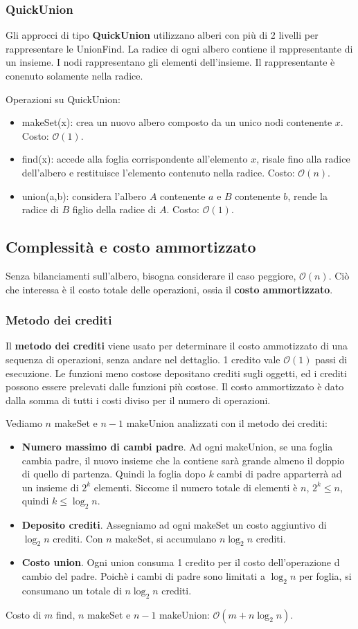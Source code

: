 \documentclass[11pt]{article}
\begin{document}
\subsubsection{QuickUnion}
Gli approcci di tipo \textbf{QuickUnion} utilizzano alberi con più di 2 livelli per rappresentare le UnionFind. La radice 
di ogni albero contiene il rappresentante di un insieme. I nodi rappresentano gli elementi dell'insieme. Il rappresentante 
è conenuto solamente nella radice.

Operazioni su QuickUnion:
\begin{itemize}
    \item makeSet(x): crea un nuovo albero composto da un unico nodi contenente $x$. Costo: $\mathcal{O}(1)$.
    \item find(x): accede alla foglia corrispondente all'elemento $x$, risale fino alla radice dell'albero e restituisce 
    l'elemento contenuto nella radice. Costo: $\mathcal{O}(n)$.
    \item union(a,b): considera l'albero $A$ contenente $a$ e $B$ contenente $b$, rende la radice di $B$ figlio della radice 
    di $A$. Costo: $\mathcal{O}(1)$.
\end{itemize}
\subsection{Complessità e costo ammortizzato}
Senza bilanciamenti sull'albero, bisogna considerare il caso peggiore, $\mathcal{O}(n)$.
Ciò che interessa è il costo totale delle operazioni, ossia il \textbf{costo ammortizzato}.
\subsubsection{Metodo dei crediti}
Il \textbf{metodo dei crediti} viene usato per determinare il costo ammotizzato di una sequenza di operazioni, senza andare 
nel dettaglio. 1 credito vale $\mathcal{O}(1)$ passi di esecuzione. Le funzioni meno costose depositano crediti sugli oggetti,
ed i crediti possono essere prelevati dalle funzioni più costose. Il costo ammortizzato è dato dalla somma di tutti i costi 
diviso per il numero di operazioni.

Vediamo $n$ makeSet e $n-1$ makeUnion analizzati con il metodo dei crediti:
\begin{itemize}
    \item \textbf{Numero massimo di cambi padre}. Ad ogni makeUnion, se una foglia cambia padre, il nuovo insieme che la
    contiene sarà grande almeno il doppio di quello di partenza. Quindi la foglia dopo $k$ cambi di padre apparterrà ad 
    un insieme di $2^k$ elementi. Siccome il numero totale di elementi è $n$, $2^k\leq n$, quindi $k\leq \log_2n$.
    \item \textbf{Deposito crediti}. Assegniamo ad ogni makeSet un costo aggiuntivo di $\log_2n$ crediti. Con $n$ makeSet, 
    si accumulano $n\log_2n$ crediti.
    \item \textbf{Costo union}. Ogni union consuma 1 credito per il costo dell'operazione d cambio del padre. Poichè i cambi 
    di padre sono limitati a $\log_2n$ per foglia, si consumano un totale di $n\log_2n$ crediti.
\end{itemize}
Costo di $m$ find, $n$ makeSet e $n-1$ makeUnion: $\mathcal{O}(m+n\log_2n)$.
\end{document}

